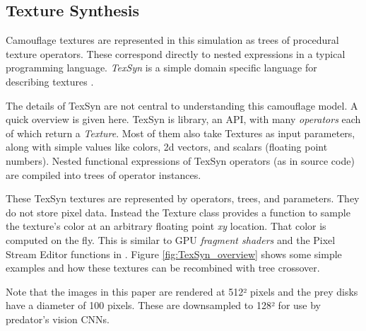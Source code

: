 \documentclass[letterpaper]{article}
\newcommand{\jargon}[1]{\textit{#1}}
\newcommand{\texsyn}[0]{TexSyn}
\begin{document}
\subsection{Texture Synthesis}
\label{subsec:texture_synthesis}
Camouflage textures are represented in this simulation as trees of procedural texture operators. These correspond directly to nested expressions in a typical programming language. \jargon{\texsyn{}} is a simple domain specific language for describing textures \cite{reynolds_texsyn_2019}.
\par
The details of \texsyn{} are not central to understanding this camouflage model. A quick overview is given here. \texsyn{} is library, an API, with many \jargon{operators} each of which return a \jargon{Texture}. Most of them also take Textures as input parameters, along with simple values like colors, 2d vectors, and scalars (floating point numbers). Nested functional expressions of \texsyn{} operators (as in source code) are compiled into trees of operator instances.
\par
These \texsyn{} textures are represented by operators, trees, and parameters. They do not store pixel data. Instead the Texture class provides a function to sample the texture's color at an arbitrary floating point \textit{xy} location. That color is computed on the fly. This is similar to GPU \jargon{fragment shaders} and the Pixel Stream Editor functions in \citet{perlin_image_1985}. Figure \ref{fig:TexSyn_overview} shows some simple examples and how these textures can be recombined with tree crossover.
\par
Note that the images in this paper are rendered at 512² pixels and the prey disks have a diameter of 100 pixels. These are downsampled to 128² for use by predator's vision CNNs.
\par

\end{document}
